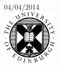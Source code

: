 \documentclass[12pt]{report} %
\begin{document}
\begin{titlepage}
{\large 04/04/2014}\\[3cm] %


\includegraphics[width=0.2\textwidth]{./UoE_Geosciences}%
 

\vfill %

\end{titlepage}
\end{document}
